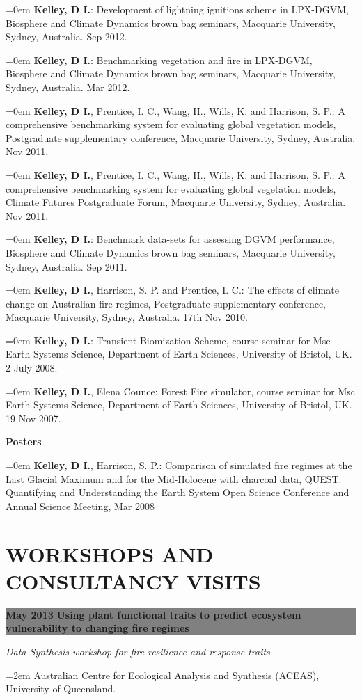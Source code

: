 \documentclass[paper=a4,fontsize=11pt]{scrartcl}	 			%
\newcommand{\sepspace}{\vspace*{0em}}			%
\newcommand{\NewPart}[1]{\vspace*{-0.5em} \section*{\uppercase{#1}} \vspace*{-0.75em} }
\newcommand{\EducationEntry}[4]{ \vspace*{0.7em}
		\noindent \colorbox{gray}{%
			\parbox{46em}{%
			\color{Black}\textbf{#2} \hspace{0.5cm} \textbf{#1}}} 				%
		\vspace*{-1em}
		\hfill 	\par				%
		\noindent \textit{#3} \par					%
		\noindent\hangindent=2em\hangafter=0 \small #4 	%
		\normalsize \par}
\newcommand{\BibEntry}[2]{
		\vspace*{-1em} \noindent \textbf{#1} \hfill \par					%
		\hangindent=0em\hangafter=0 \small #2} 	%
\begin{document}
\BibEntry{} {\textbf{Kelley, D I.}: Development of lightning ignitions scheme in LPX-DGVM, Biosphere and Climate Dynamics brown bag seminars, Macquarie University, Sydney, Australia. Sep 2012.}

\BibEntry{} {\textbf{Kelley, D I.}: Benchmarking vegetation and fire in LPX-DGVM, Biosphere and Climate Dynamics brown bag seminars, Macquarie University, Sydney, Australia. Mar 2012.}

\BibEntry{} {\textbf{Kelley, D I.}, Prentice, I. C., Wang, H., Wills, K. and Harrison, S. P.: A comprehensive benchmarking system for evaluating global vegetation models, Postgraduate supplementary conference, Macquarie University, Sydney, Australia. Nov 2011.}

\BibEntry{} {\textbf{Kelley, D I.}, Prentice, I. C., Wang, H., Wills, K. and Harrison, S. P.: A comprehensive benchmarking system for evaluating global vegetation models, Climate Futures Postgraduate Forum, Macquarie University, Sydney, Australia. Nov 2011.}


\BibEntry{} {\textbf{Kelley, D I.}: Benchmark data-sets for assessing DGVM performance, Biosphere and Climate Dynamics brown bag seminars, Macquarie University, Sydney, Australia. Sep 2011.}

\BibEntry{} {\textbf{Kelley, D I.}, Harrison, S. P. and Prentice, I. C.: The effects of climate change on Australian fire regimes, Postgraduate supplementary conference, Macquarie University, Sydney, Australia. 17th Nov 2010.}

\BibEntry{} {\textbf{Kelley, D I.}: Transient Biomization Scheme, course seminar for Msc Earth Systems Science, Department of Earth Sciences, University of Bristol, UK. 2 July 2008.}

\BibEntry{} {\textbf{Kelley, D I.}, Elena Counce: Forest Fire simulator, course seminar for Msc Earth Systems Science, Department of Earth Sciences, University of Bristol, UK. 19 Nov 2007.}
\sepspace

\BibEntry{\newline \newline  Posters} {\textbf{Kelley, D I.}, Harrison, S. P.: Comparison of simulated fire regimes at the Last Glacial Maximum and for the Mid-Holocene with charcoal data, QUEST: Quantifying and Understanding the Earth System Open Science Conference and Annual Science Meeting, Mar 2008}
\pagebreak 
\NewPart{Workshops and Consultancy Visits}
\EducationEntry{Using plant functional traits to predict ecosystem vulnerability to changing fire regimes}{May 2013} {\newline \newline Data Synthesis workshop for fire resilience and response traits}{Australian Centre for Ecological Analysis and Synthesis (ACEAS), University of Queensland.}
\sepspace
\end{document}
